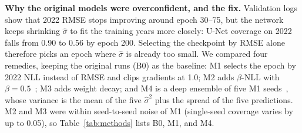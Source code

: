 \documentclass[conference]{IEEEtran}
\begin{document}
\textbf{Why the original models were overconfident, and the fix.} Validation logs show that 2022 RMSE stops improving around epoch 30--75, but the network keeps shrinking \(\hat\sigma\) to fit the training years more closely: U-Net coverage on 2022 falls from 0.90 to 0.56 by epoch 200. Selecting the checkpoint by RMSE alone therefore picks an epoch where \(\hat\sigma\) is already too small. We compared four remedies, keeping the original runs (B0) as the baseline: M1 selects the epoch by 2022 NLL instead of RMSE and clips gradients at 1.0; M2 adds \(\beta\)-NLL with \(\beta=0.5\)~\cite{seitzer2022pitfalls}; M3 adds weight decay; and M4 is a deep ensemble of five M1 seeds~\cite{lakshminarayanan2017ensembles}, whose variance is the mean of the five \(\hat\sigma^2\) plus the spread of the five predictions. M2 and M3 were within seed-to-seed noise of M1 (single-seed coverage varies by up to 0.05), so Table~\ref{tab:methods} lists B0, M1, and M4.

\begin{table}[htbp]
\caption{RQ3 remedies on 2023. Cov.: raw 90\% coverage (target 0.90); \(\rho\): rank correlation of \(\hat\sigma\) and \(|y-\hat y|\); width and misses use the calibrated range \(\hat y\pm\hat\lambda\hat\sigma\) (honest \(\hat\lambda=1.645\)).}
\label{tab:methods}
\centering\footnotesize
\setlength{\tabcolsep}{2.5pt}
\end{table}
\end{document}
